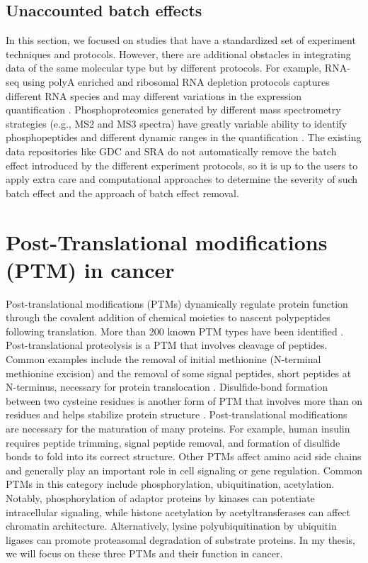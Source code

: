 \subsection{Unaccounted batch effects}
In this section, we focused on studies that have a standardized set of experiment techniques and protocols. However, there are additional obstacles in integrating data of the same molecular type but by different protocols. For example, RNA-seq using polyA enriched and ribosomal RNA depletion protocols captures different RNA species and may different variations in the expression quantification \cite{cuip_yuj:ComparisonRibominus2010,chenl_chenl:PairedRRNAdepleted2020}. Phosphoproteomics generated by different mass spectrometry strategies (e.g., MS2 and MS3 spectra) have greatly variable ability to identify phosphopeptides and different dynamic ranges in the quantification \cite{ulintzpj_nesvizhskiiai:ComparisonMS2only2009}. The existing data repositories like GDC and SRA do not automatically remove the batch effect introduced by the different experiment protocols, so it is up to the users to apply extra care and computational approaches to determine the severity of such batch effect and the approach of batch effect removal.



\section{Post-Translational modifications (PTM) in cancer}
Post-translational modifications (PTMs) dynamically regulate protein function through the covalent addition of chemical moieties to nascent polypeptides following translation. More than 200 known PTM types have been identified \cite{deribeyl_dikici:PosttranslationalModifications2010}. Post-translational proteolysis is a PTM that involves cleavage of peptides. Common examples include the removal of initial methionine (N-terminal methionine excision) \cite{giglionec_meinnelt:ProteinNterminal2004} and the removal of some signal peptides, short peptides at N-terminus, necessary for protein translocation \cite{martogliob_dobbersteinb:SignalSequences1998}. Disulfide-bond formation between two cysteine residues is another form of PTM that involves more than on residues and helps stabilize protein structure \cite{wedemeyerwj_scheragaha:DisulfideBonds2000}. Post-translational modifications are necessary for the maturation of many proteins. For example, human insulin requires peptide trimming, signal peptide removal, and formation of disulfide bonds to fold into its correct structure. Other PTMs affect amino acid side chains and generally play an important role in cell signaling or gene regulation. Common PTMs in this category include phosphorylation, ubiquitination, acetylation. Notably, phosphorylation of adaptor proteins by kinases can potentiate intracellular signaling, while histone acetylation by acetyltransferases can affect chromatin architecture. Alternatively, lysine polyubiquitination by ubiquitin ligases can promote proteasomal degradation of substrate proteins. In my thesis, we will focus on these three PTMs and their function in cancer.


